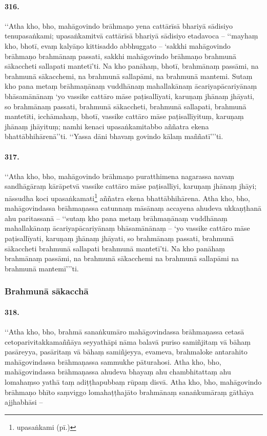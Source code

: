 \paragraph{316.} ‘‘Atha kho, bho, mahāgovindo brāhmaṇo yena cattārīsā bhariyā sādisiyo tenupasaṅkami; upasaṅkamitvā cattārīsā bhariyā sādisiyo etadavoca – ‘‘mayhaṃ kho, bhotī, evaṃ kalyāṇo kittisaddo abbhuggato – ‘sakkhi mahāgovindo brāhmaṇo brahmānaṃ passati, sakkhi mahāgovindo brāhmaṇo brahmunā sākaccheti sallapati mantetī’ti. Na kho panāhaṃ, bhotī, brahmānaṃ passāmi, na brahmunā sākacchemi, na brahmunā sallapāmi, na brahmunā mantemi. Sutaṃ kho pana metaṃ brāhmaṇānaṃ vuddhānaṃ mahallakānaṃ ācariyapācariyānaṃ bhāsamānānaṃ ‘yo vassike cattāro māse paṭisallīyati, karuṇaṃ jhānaṃ jhāyati, so brahmānaṃ passati, brahmunā sākaccheti, brahmunā sallapati, brahmunā mantetīti, icchāmahaṃ, bhotī, vassike cattāro māse paṭisallīyituṃ, karuṇaṃ jhānaṃ jhāyituṃ; namhi kenaci upasaṅkamitabbo aññatra ekena bhattābhihārenā’’ti. ‘‘Yassa dāni bhavaṃ govindo kālaṃ maññatī’’’ti.

\paragraph{317.} ‘‘Atha kho, bho, mahāgovindo brāhmaṇo puratthimena nagarassa navaṃ sandhāgāraṃ kārāpetvā vassike cattāro māse paṭisallīyi, karuṇaṃ jhānaṃ jhāyi; nāssudha koci upasaṅkamati\footnote{upasaṅkami (pī.)} aññatra ekena bhattābhihārena. Atha kho, bho, mahāgovindassa brāhmaṇassa catunnaṃ māsānaṃ accayena ahudeva ukkaṇṭhanā ahu paritassanā – ‘‘sutaṃ kho pana metaṃ brāhmaṇānaṃ vuddhānaṃ mahallakānaṃ ācariyapācariyānaṃ bhāsamānānaṃ – ‘yo vassike cattāro māse paṭisallīyati, karuṇaṃ jhānaṃ jhāyati, so brahmānaṃ passati, brahmunā sākaccheti brahmunā sallapati brahmunā mantetī’ti. Na kho panāhaṃ brahmānaṃ passāmi, na brahmunā sākacchemi na brahmunā sallapāmi na brahmunā mantemī’’’ti.

\subsubsection{Brahmunā sākacchā}

\paragraph{318.} ‘‘Atha kho, bho, brahmā sanaṅkumāro mahāgovindassa brāhmaṇassa cetasā cetoparivitakkamaññāya seyyathāpi nāma balavā puriso samiñjitaṃ vā bāhaṃ pasāreyya, pasāritaṃ vā bāhaṃ samiñjeyya, evameva, brahmaloke antarahito mahāgovindassa brāhmaṇassa sammukhe pāturahosi. Atha kho, bho, mahāgovindassa brāhmaṇassa ahudeva bhayaṃ ahu chambhitattaṃ ahu lomahaṃso yathā taṃ adiṭṭhapubbaṃ rūpaṃ disvā. Atha kho, bho, mahāgovindo brāhmaṇo bhīto saṃviggo lomahaṭṭhajāto brahmānaṃ sanaṅkumāraṃ gāthāya ajjhabhāsi –

